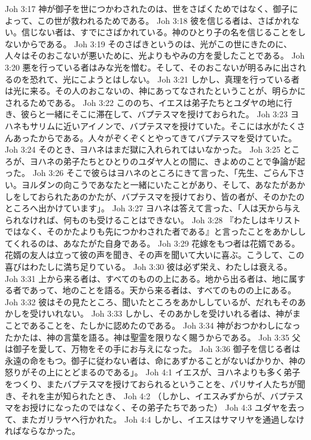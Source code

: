 Joh 3:17  神が御子を世につかわされたのは、世をさばくためではなく、御子によって、この世が救われるためである。
Joh 3:18  彼を信じる者は、さばかれない。信じない者は、すでにさばかれている。神のひとり子の名を信じることをしないからである。
Joh 3:19  そのさばきというのは、光がこの世にきたのに、人々はそのおこないが悪いために、光よりもやみの方を愛したことである。
Joh 3:20  悪を行っている者はみな光を憎む。そして、そのおこないが明るみに出されるのを恐れて、光にこようとはしない。
Joh 3:21  しかし、真理を行っている者は光に来る。その人のおこないの、神にあってなされたということが、明らかにされるためである。
Joh 3:22  こののち、イエスは弟子たちとユダヤの地に行き、彼らと一緒にそこに滞在して、バプテスマを授けておられた。
Joh 3:23  ヨハネもサリムに近いアイノンで、バプテスマを授けていた。そこには水がたくさんあったからである。人々がぞくぞくとやってきてバプテスマを受けていた。
Joh 3:24  そのとき、ヨハネはまだ獄に入れられてはいなかった。
Joh 3:25  ところが、ヨハネの弟子たちとひとりのユダヤ人との間に、きよめのことで争論が起った。
Joh 3:26  そこで彼らはヨハネのところにきて言った、「先生、ごらん下さい。ヨルダンの向こうであなたと一緒にいたことがあり、そして、あなたがあかしをしておられたあのかたが、バプテスマを授けており、皆の者が、そのかたのところへ出かけています」。
Joh 3:27  ヨハネは答えて言った、「人は天から与えられなければ、何ものも受けることはできない。
Joh 3:28  『わたしはキリストではなく、そのかたよりも先につかわされた者である』と言ったことをあかししてくれるのは、あなたがた自身である。
Joh 3:29  花嫁をもつ者は花婿である。花婿の友人は立って彼の声を聞き、その声を聞いて大いに喜ぶ。こうして、この喜びはわたしに満ち足りている。
Joh 3:30  彼は必ず栄え、わたしは衰える。
Joh 3:31  上から来る者は、すべてのものの上にある。地から出る者は、地に属する者であって、地のことを語る。天から来る者は、すべてのものの上にある。
Joh 3:32  彼はその見たところ、聞いたところをあかししているが、だれもそのあかしを受けいれない。
Joh 3:33  しかし、そのあかしを受けいれる者は、神がまことであることを、たしかに認めたのである。
Joh 3:34  神がおつかわしになったかたは、神の言葉を語る。神は聖霊を限りなく賜うからである。
Joh 3:35  父は御子を愛して、万物をその手にお与えになった。
Joh 3:36  御子を信じる者は永遠の命をもつ。御子に従わない者は、命にあずかることがないばかりか、神の怒りがその上にとどまるのである」。
Joh 4:1  イエスが、ヨハネよりも多く弟子をつくり、またバプテスマを授けておられるということを、パリサイ人たちが聞き、それを主が知られたとき、
Joh 4:2  （しかし、イエスみずからが、バプテスマをお授けになったのではなく、その弟子たちであった）
Joh 4:3  ユダヤを去って、またガリラヤへ行かれた。
Joh 4:4  しかし、イエスはサマリヤを通過しなければならなかった。
